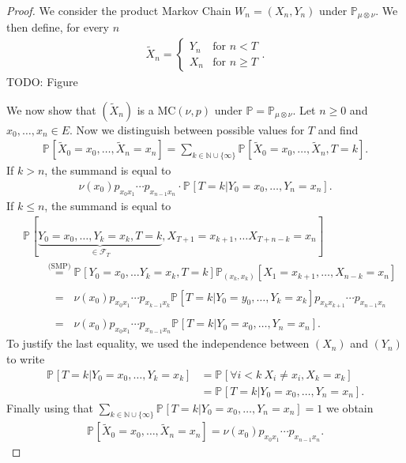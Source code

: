 \begin{proof}
	We consider the product Markov Chain $W_n = (X_n, Y_n)$ under $\mathbb{P}_{\mu \otimes \nu}$. We then define, for every $n$ 
	\begin{align}
		\tilde{X}_n =
	\begin{cases}
		Y_n & \textrm{for } n < T \\
		X_n & \textrm{for } n \geq T
	\end{cases}
	.\end{align}
TODO: Figure

We now show that $(\tilde{X}_n)$ is a MC$(\nu, p)$ under $\mathbb{P} = \mathbb{P}_{\mu \otimes \nu}$. Let $n\geq 0$ and $x_0, \ldots, x_n \in E$. Now we distinguish between possible values for $T$ and find
\begin{align}
	\mathbb{P}_{} \left[ \tilde{X}_0 = x_0, \ldots , \tilde{X}_n = x_n \right] = \sum_{k \in \mathbb{N} \cup \{\infty\}}^{} \mathbb{P}_{} \left[ \tilde{X}_0 = x_0, \ldots , \tilde{X}_n , T=k \right] .
\end{align}
If $k>n$, the summand is equal to 
\begin{align}
	\nu (x_0) p_{x_0x_1}\cdots p_{x_{n-1}x_n} \cdot \mathbb{P}_{} \left[ T=k | Y_0 = x_0, \ldots , Y_n=x_n \right].
\end{align}
If $k \leq n$, the summand is equal to
\begin{align}
	&\mathbb{P}_{} \left[ \underbrace{Y_0=x_0, \ldots , Y_k=x_k,T=k}_{\in \mathcal{F}_T},X_{T+1}=x_{k+1}, \ldots X_{T+n-k}=x_n \right]  \\
	&\qquad \stackrel{\textrm{(SMP)}}{=} \mathbb{P}_{} \left[ Y_0=x_0, \ldots Y_k=x_k, T=k \right] \mathbb{P}_{(x_k, x_k)} \left[ X_1=x_{k+1}, \ldots , X_{n-k}=x_n \right]  \\
	&\qquad \stackrel{\phantom{\textrm{(SMP)}}}{=} \nu (x_0) p_{x_0x_1}\cdots p_{x_{k-1}x_k} \mathbb{P}_{} \left[ T=k | Y_0 = y_0, \ldots, Y_k=x_k \right] p_{x_k x_{k+1}} \cdots p_{x_{n-1}x_n}  \\
	&\qquad \stackrel{\phantom{\textrm{(SMP)}}}{=} \nu (x_0) p_{x_0 x_1} \cdots p_{x_{n-1}x_n} \mathbb{P}_{} \left[ T=k | Y_0=x_0, \ldots, Y_n=x_n \right]  .
\end{align}
To justify the last equality, we used the independence between $(X_n)$ and $(Y_n)$ to write
 \begin{align}
	 \mathbb{P}_{} \left[ T=k | Y_0=x_0, \ldots , Y_k =x_k \right] &= \mathbb{P}_{} \left[ \forall i<k\ X_i \neq x_i, X_k=x_k \right] \\
								       &= \mathbb{P}_{} \left[ T=k | Y_0=x_0, \ldots , Y_n=x_n \right] . 
\end{align}
Finally using that $\sum_{k \in \mathbb{N}\cup \{\infty\}}^{} \mathbb{P}_{} \left[ T=k | Y_0 = x_0, \ldots , Y_n =x_n \right] =1$ we obtain
\begin{align}
	\mathbb{P}_{} \left[ \tilde{X}_0 = x_0, \ldots , \tilde{X}_n=x_n \right] = \nu (x_0) p_{x_0 x_1} \cdots p_{x_{n-1}x_n}.
\end{align}
\end{proof}
